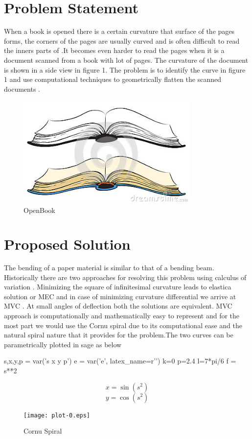 \documentclass[longbibliography]{revtex4-1}
\begin{document}
\section{Problem Statement}
When a book is opened there is a certain curvature that surface of the pages forms, the corners of the pages are usually curved and is often difficult to read the inners parts of .It becomes even harder to read the pages when it is a document scanned from a book with lot of pages. The curvature of the document is shown in a side view in figure 1. The problem is to identify the curve in figure 1 and use computational techniques to geometrically flatten the scanned documents .
\begin{figure}
  \centering
  \caption{OpenBook}
  \includegraphics[width=0.8\textwidth,natwidth=610,natheight=642]{figure1.jpg} 
\end{figure}

\section{Proposed Solution}
The bending of a paper material is similar to that of a bending beam. Historically there are two approaches for resolving this problem using calculus of variation . Minimizing the square of infinitesimal curvature leads to elastica solution or MEC and in case of minimizing curvature differential we arrive at MVC . At small angles of deflection both the solutions are equivalent. MVC approach is computationally and mathematically easy to represent and for the most part we would use the Cornu spiral due to its computational ease and the natural spiral nature that it provides for the problem.The two curves can be parametrically plotted in sage as below

\begin{sagesilent}
s,x,y,p = var('s x y p')
e = var('e', latex_name=r'\vartheta')
k=0
p=2.4
l=7*pi/6
f = s**2
\end{sagesilent}
\[
x=\sin(s^2)
\]
\[
y=\cos(s^2)
\]
\begin{figure}
\centering
\texttt{[image: plot-0.eps]}
\caption{Cornu Spiral}
\end{figure}
\end{document}

